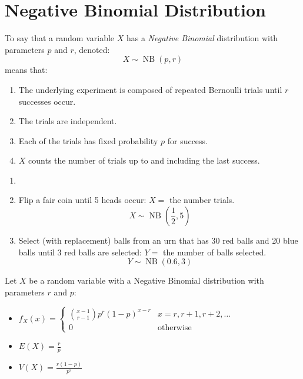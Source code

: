 \documentclass[letterpaper,12pt,fleqn]{article}
\DeclareMathOperator{\nb}{NB}
\begin{document}
\section*{Negative Binomial Distribution}

\begin{definition}
  To say that a random variable \(X\) has a \emph{Negative Binomial} distribution with parameters \(p\) and \(r\), denoted:
  \[X\sim\nb(p,r)\]
  means that:
  \begin{enumerate}
  \item The underlying experiment is composed of repeated Bernoulli trials until \(r\) successes occur.
  \item The trials are independent.
  \item Each of the trials has fixed probability \(p\) for success.
  \item \(X\) counts the number of trials up to and including the last success.
  \end{enumerate}
\end{definition}

\begin{examples}
  \begin{enumerate}
  \item[]
  \item Flip a fair coin until 5 heads occur: \(X=\) the number trials.
    \[X\sim\nb\left(\frac{1}{2},5\right)\]
  \item Select (with replacement) balls from an urn that has 30 red balls and 20 blue balls until 3 red balls are
    selected: \(Y=\) the number of balls selected.
    \[Y\sim\nb\left(0.6,3\right)\]
  \end{enumerate}
\end{examples}

\begin{theorem}
  Let \(X\) be a random variable with a Negative Binomial distribution with parameters \(r\) and \(p\):
  \begin{itemize}
  \item \(f_X(x)=\begin{cases}
    \binom{x-1}{r-1}p^r(1-p)^{x-r} & x=r,r+1,r+2,\ldots \\
    0 & \text{otherwise}
  \end{cases}\)
  \item \(E(X)=\frac{r}{p}\)
  \item \(V(X)=\frac{r(1-p)}{p^2}\)
  \end{itemize}
\end{theorem}
\end{document}
